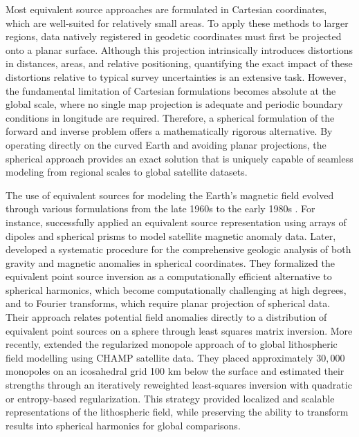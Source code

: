 Most equivalent source approaches are formulated in Cartesian coordinates, which
are well-suited for relatively small areas. To apply these methods to larger
regions, data natively registered in geodetic 
coordinates must first be projected onto a planar surface. Although this
projection intrinsically introduces distortions in distances, areas, and
relative positioning, quantifying the exact impact of these distortions
relative to typical survey uncertainties is an extensive task. However, the
fundamental limitation of Cartesian formulations becomes absolute at the
global scale, where no single map projection is adequate and periodic boundary
conditions in longitude are required. Therefore, a spherical formulation of
the forward and inverse problem offers a mathematically rigorous alternative.
By operating directly on the curved Earth and avoiding planar projections, the
spherical approach provides an exact solution that is uniquely capable of
seamless modeling from regional scales to global satellite datasets.

The use of equivalent sources for modeling the Earth's magnetic field evolved through
various formulations from the late 1960s to the early 1980s
\citep{Alldredge1969, Mayhew1979, Mayhew1980, Reilly1978, Mayhew1982}.
For instance, \citet{Mayhew1979} successfully applied an equivalent source
representation using arrays of dipoles and spherical prisms to model
satellite magnetic anomaly data. Later,
\citet{VonFrese1981} developed a systematic procedure for the comprehensive
geologic analysis of both gravity and magnetic anomalies in spherical
coordinates. They formalized the equivalent point source inversion as a
computationally efficient alternative to spherical harmonics, which become
computationally challenging at high degrees, and to Fourier transforms, which require planar
projection of spherical data. Their approach relates potential field anomalies
directly to a distribution of equivalent point sources on a sphere through
least squares matrix inversion.
More recently, \citet{Kother2015} extended the regularized monopole
approach of \citet{Obrien1994} to global lithospheric field modelling
using CHAMP satellite data. They placed approximately $30,000$ monopoles on
an icosahedral grid 100 km below the surface and estimated their
strengths through an iteratively reweighted least-squares inversion with
quadratic or entropy-based regularization. This strategy provided
localized and scalable representations of the lithospheric field, while
preserving the ability to transform results into spherical harmonics for
global comparisons.

